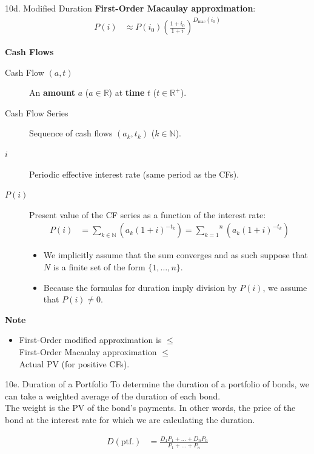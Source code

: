 \begin{CHPT_SUMM_AUTO}[label = {L.-10d}]{10d. Modified Duration}
\textbf{First-Order Macaulay approximation}:
\begin{align*}
	P(i)
	&\approx	P(i_{0}) \left( \frac{1 + i_{0}}{1 + i} \right)^{D_{\text{mac}}(i_{0})}
\end{align*}
\end{CHPT_SUMM_AUTO}

\begin{distributions}
\begin{center}
	\textbf{Cash Flows}
\end{center}
\begin{description}
	\item[Cash Flow $(a, t)$]	An \textbf{amount} $a$ ($a \in \mathbb{R}$) at \textbf{time} $t$ ($t \in \mathbb{R}^{+}$).
	\item[Cash Flow Series]	Sequence of cash flows $(a_{k}, t_{k})$ ($k \in \mathbb{N}$).
	\item[$i$]	Periodic effective interest rate (same period as the CFs).
	\item[$P(i)$]	Present value of the CF series as a function of the interest rate:
		\begin{align*}
		P(i)	
		&=	\underset{k \in \mathbb{N}}{\sum} \left( a_{k} (1 + i)^{-t_{k}} \right)
		=	\overset{n}{\underset{k = 1}{\sum}} \left( a_{k} (1 + i)^{-t_{k}} \right)
		\end{align*}
		\begin{itemize}[leftmargin = *]
		\item	We implicitly assume that the sum converges and as such suppose that $N$ is a finite set of the form $\{1, \dots, n\}$.
		\item	Because the formulas for duration imply division by $P(i)$, we assume that $P(i) \neq 0$.
		\end{itemize}
\end{description}

\textbf{Note}
\begin{itemize}[leftmargin = *]
	\item	First-Order modified approximation is $\le$\\
	 		First-Order Macaulay approximation $\le$ \\
	 		Actual PV (for positive CFs).
\end{itemize}
\end{distributions}

\begin{CHPT_SUMM_AUTO}[label = {L.-10e}]{10e. Duration of a Portfolio}
To determine the duration of a portfolio of bonds, we can take a weighted average of the duration of each bond. \\
The weight is the PV of the bond's payments. In other words, the price of the bond at the interest rate for which we are calculating the duration.

\begin{align*}
	D(\text{ptf.}) 
	&=	\frac{D_{1}P_{1} + \dots + D_{n}P_{n}}{P_{1} + \dots + P_{n}}
\end{align*}
\end{CHPT_SUMM_AUTO}

